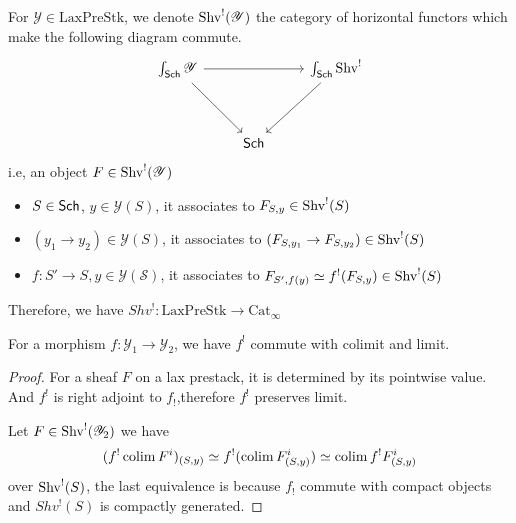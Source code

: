 \documentclass[oneside]{amsart}
\newcommand{\laxprestk}{\mathrm{LaxPreStk} }
\newcommand{\Cat}{\mathrm{Cat}}
\begin{document}
\begin{definition}
    For $\mathcal{Y} \in \laxprestk$, we denote $\operatorname{Shv}^!(\mathscr{Y})$ the category of horizontal  functors which make the following diagram commute.%
\[\begin{tikzcd}
	{\int_\Sch \mathcal{Y}} && {\int_{\Sch} \Shv^!} \\
	\\
	& \Sch
	\arrow[from=1-1, to=1-3]
	\arrow[from=1-1, to=3-2]
	\arrow[from=1-3, to=3-2]
\end{tikzcd}\]
i.e, an object $F \in \operatorname{Shv}^!(\mathscr{Y})$
\begin{itemize}
    \item  $S \in \mathsf{Sch}$, $y \in \mathcal{Y}(S)$, it associates to $F_{S,y} \in \operatorname{Shv}^!(S)$
    \item[New] $(y_1 \to y_2) \in \mathcal{Y}(S)$, it associates to $(F_{S,y_1} \to F_{S,y_2}) \in \Shv^!(S)$
    \item $f \colon S' \to S, y \in \mathcal{Y(S)}$, it associates to $F_{S',f(y)} \simeq f^!(F_{S,y}) \in \operatorname{Shv}^!(S)$
\end{itemize}
Therefore, we have $Shv^! \colon \laxprestk \to \Cat_\infty$
\end{definition}

\begin{proposition}
    For a morphism $f \colon \mathcal{Y}_1 \to \mathcal{Y}_2$, we have $f^!$ commute with colimit and limit.
\end{proposition}

\begin{proof}
For a sheaf $F$ on a lax prestack, it is determined by its pointwise value. And  $f^!$ is right adjoint to $f_!$,therefore $f^!$ preserves limit.

Let $F \in \operatorname{Shv}^!(\mathscr{Y}_2)$ we have $$(f^!\operatorname*{colim} F^i)_{(S,y)} \simeq f^!(\operatorname*{colim} F^i_{(S,y)}) \simeq \operatorname*{colim} f^!F^i_{(S,y)}$$ over $\operatorname{Shv}^!(S)$, the last equivalence is because $f_!$ commute with compact objects and $Shv^!(S)$ is compactly generated.
\end{proof}
\end{document}
